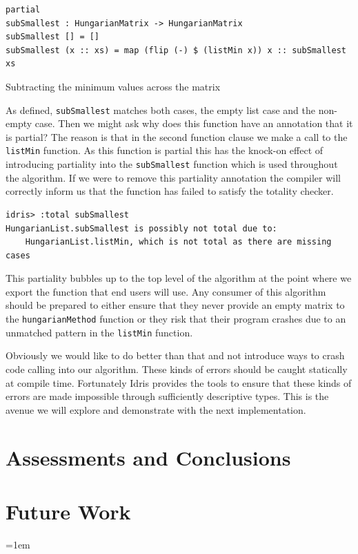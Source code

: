 \documentclass[a4paper, notitlepage]{report}
\begin{document}
\begin{listing}[H]
\begin{verbatim}
partial
subSmallest : HungarianMatrix -> HungarianMatrix
subSmallest [] = []
subSmallest (x :: xs) = map (flip (-) $ (listMin x)) x :: subSmallest xs
\end{verbatim}
\caption{Subtracting the minimum values across the matrix}
\end{listing}

As defined, \texttt{subSmallest} matches both cases, the empty list case and the
non-empty case. Then we might ask why does this function have an annotation that
it is partial? The reason is that in the second function clause we make a call
to the \texttt{listMin} function. As this function is partial this has the knock-on
effect of introducing partiality into the \texttt{subSmallest} function which is used
throughout the algorithm. If we were to remove this partiality annotation the
compiler will correctly inform us that the function has failed to satisfy the
totality checker.

\begin{verbatim}
idris> :total subSmallest
HungarianList.subSmallest is possibly not total due to:
    HungarianList.listMin, which is not total as there are missing cases
\end{verbatim}

This partiality bubbles up to the top level of the algorithm at the point where
we export the function that end users will use. Any consumer of this algorithm
should be prepared to either ensure that they never provide an empty matrix to
the \texttt{hungarianMethod} function or they risk that their program crashes due to an
unmatched pattern in the \texttt{listMin} function.

Obviously we would like to do better than that and not introduce ways to crash
code calling into our algorithm. These kinds of errors should be caught
statically at compile time. Fortunately Idris provides the tools to ensure that
these kinds of errors are made impossible through sufficiently descriptive
types. This is the avenue we will explore and demonstrate with the next
implementation.
\chapter{Assessments and Conclusions}
\label{sec:org2756c65}
\chapter{Future Work}
\label{sec:org7c28e6e}

\emergencystretch=1em
\printbibliography[heading=bibintoc, title=References]
\appendix
\end{document}
